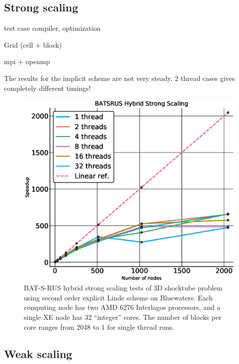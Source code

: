 \documentclass[11pt]{book} %
\begin{document}
\subsection{Strong scaling}



test case
compiler, optimization


Grid (cell + block)

mpi + openmp

The results for the implicit scheme are not very steady. 2 thread cases gives completely different timings!

\begin{figure}[h]
    \centering
    \includegraphics[width=\textwidth]{./figures/StrongScale_base32_linear}
    \caption{BAT-S-RUS hybrid strong scaling tests of 3D shocktube problem using second order explicit Linde scheme on Bluewaters. Each computing node has two AMD 6276 Interlagos processors, and a single XE node has 32 ``integer'' cores. The number of blocks per core ranges from 2048 to 1 for single thread runs.}
    \label{fig:StrongScale}
\end{figure}


\subsection{Weak scaling}
\end{document}
